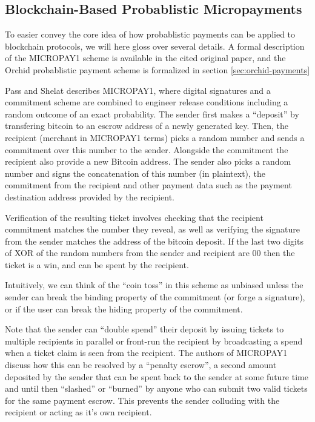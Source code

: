 \subsection{Blockchain-Based Probablistic Micropayments}

To easier convey the core idea of how probablistic payments can be applied to blockchain protocols, we will here gloss over several details. A formal description of the MICROPAY1 scheme is available in the cited original paper, and the Orchid probablistic payment scheme is formalized in section \ref{sec:orchid-payments}

Pass and Shelat describes MICROPAY1\cite{Micropayments}, where digital signatures and a commitment scheme are combined to engineer release conditions including a random outcome of an exact probability. The sender first makes a ``deposit'' by transfering bitcoin to an escrow address of a newly generated key. Then, the recipient (merchant in MICROPAY1 terms) picks a random number and sends a commitment over this number to the sender. Alongside the commitment the recipient also provide a new Bitcoin address. The sender also picks a random number and signs the concatenation of this number (in plaintext), the commitment from the recipient and other payment data such as the payment destination address provided by the recipient.

Verification of the resulting ticket involves checking that the recipient commitment matches the number they reveal, as well as verifying the signature from the sender matches the address of the bitcoin deposit. If the last two digits of XOR of the random numbers from the sender and recipient are 00 then the ticket is a win, and can be spent by the recipient.

Intuitively, we can think of the ``coin toss'' in this scheme as unbiased unless the sender can break the binding property of the commitment (or forge a signature), or if the user can break the hiding property of the commitment.

Note that the sender can ``double spend'' their deposit by issuing tickets to multiple recipients in parallel or front-run the recipient by broadcasting a spend when a ticket claim is seen from the recipient. The authors of MICROPAY1 discuss how this can be resolved by a ``penalty escrow'', a second amount deposited by the sender that can be spent back to the sender at some future time and until then  ``slashed'' or ``burned'' by anyone who can submit two valid tickets for the same payment escrow. This prevents the sender colluding with the recipient or acting as it's own recipient.

